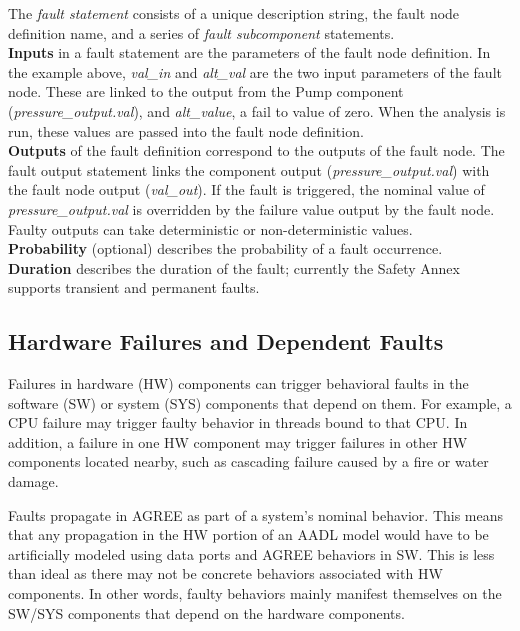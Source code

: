 The \textit{fault statement} consists of a unique description string, the fault node definition name, and a series of \textit{fault subcomponent} statements. \\
\textbf{Inputs} in a fault statement are the parameters of the fault node definition. In the example above, \textit{val\_in} and \textit{alt\_val} are the two input parameters of the fault node. These are linked to the output from the Pump component (\textit{pressure\_output.val}), and \textit{alt\_value}, a fail to value of zero. When the analysis is run, these values are passed into the fault node definition.\\
\textbf{Outputs} of the fault definition correspond to the outputs of the fault node. The fault output statement links the component output (\textit{pressure\_output.val}) with the fault node output (\textit{val\_out}). If the fault is triggered, the nominal value of \textit{pressure\_output.val} is overridden by the failure value output by the fault node. Faulty outputs can take deterministic or non-deterministic values. \\
\textbf{Probability} (optional) describes the probability of a fault occurrence.\\
\textbf{Duration} describes the duration of the fault; currently the Safety Annex supports transient and permanent faults.\\

\subsection{Hardware Failures and Dependent Faults}

Failures in hardware (HW) components can trigger behavioral faults in the software (SW) or system (SYS) components that depend on them.  For example, a CPU failure may trigger faulty behavior in threads bound to that CPU. In addition, a failure in one HW component may trigger failures in other HW components located nearby, such as cascading failure caused by a fire or water damage.

Faults propagate in AGREE as part of a system’s nominal behavior. This means that any propagation in the HW portion of an AADL model would have to be artificially modeled using data ports and AGREE behaviors in SW. This is less than ideal as there may not be concrete behaviors associated with HW components. In other words, faulty behaviors mainly manifest themselves on the SW/SYS components that depend on the hardware components.


